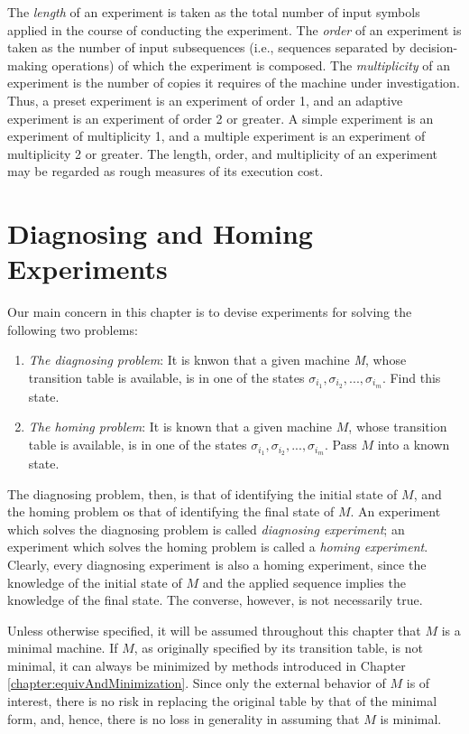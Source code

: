     The \emph{length} of an experiment is taken as the total number of input symbols applied in the course of conducting the experiment. The \emph{order} of an experiment is taken as the number of input subsequences (i.e., sequences separated by decision-making operations) of which the experiment is composed. The \emph{multiplicity} of an experiment is the number of copies it requires of the machine under investigation. Thus, a preset experiment is an experiment of order 1, and an adaptive experiment is an experiment of order 2 or greater. A simple experiment is an experiment of multiplicity 1, and a multiple experiment is an experiment of multiplicity 2 or greater. The length, order, and multiplicity of an experiment may be regarded as rough measures of its execution cost.

\section{Diagnosing and Homing Experiments}

    Our main concern in this chapter is to devise experiments for solving the following two problems:
\begin{enumerate}
    \item \emph{The diagnosing problem}: It is knwon that a given machine \emph{M}, whose transition table is available, is in one of the states $ \sigma_{i_{1}}, \sigma_{i_{2}}, ..., \sigma_{i_{m}}  $. Find this state.

    \item \emph{The homing problem}: It is known that a given machine $M$, whose transition table is available, is in one of the states $\sigma_{i_{1}}, \sigma_{i_{2}}, ..., \sigma_{i_{m}}$. Pass $M$ into a known state.
\end{enumerate}


    The diagnosing problem, then, is that of identifying the initial state of $M$, and the homing problem os that of identifying the final state of $M$. An experiment which solves the diagnosing problem is called \emph{diagnosing experiment}; an experiment which solves the homing problem is called a \emph{homing experiment}. Clearly, every diagnosing experiment is also a homing experiment, since the knowledge of the initial state of $M$ and the applied sequence implies the knowledge of the final state. The converse, however, is not necessarily true.

    Unless otherwise specified, it will be assumed throughout this chapter that $M$ is a minimal machine. If $M$, as originally specified by its transition table, is not minimal, it can always be minimized by methods introduced in Chapter \ref{chapter:equivAndMinimization}. Since only the external behavior of $M$ is of interest, there is no risk in replacing the original table by that of the minimal form, and, hence, there is no loss in generality in assuming that $M$ is minimal.

